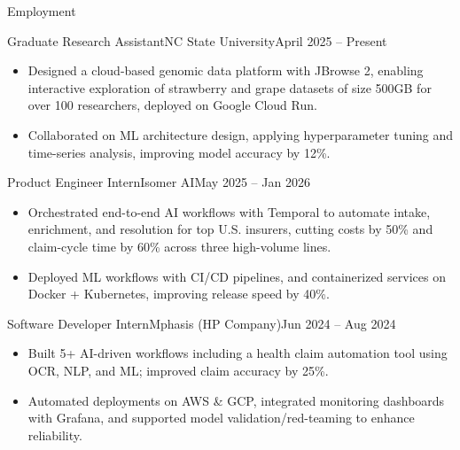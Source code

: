 \documentclass[]{mcdowellcv}
\begin{document}
\makeheader


\begin{cvsection}{Employment}
  \begin{cvsubsection}{Graduate Research Assistant}{NC State University}{April 2025 -- Present}
    \begin{itemize}
      \item Designed a cloud-based genomic data platform with JBrowse 2, enabling interactive exploration of strawberry and grape datasets of size 500GB for over 100 researchers, deployed on Google Cloud Run.
      \item Collaborated on ML architecture design, applying hyperparameter tuning and time-series analysis, improving model accuracy by 12\%.
    \end{itemize}
    \vspace{-1.5pt}
  \end{cvsubsection}

  \begin{cvsubsection}{Product Engineer Intern}{Isomer AI}{May 2025 -- Jan 2026}
    \begin{itemize}
      \item Orchestrated end-to-end AI workflows with Temporal to automate intake, enrichment, and resolution for top U.S. insurers, cutting costs by 50\% and claim-cycle time by 60\% across three high-volume lines.
      \item Deployed ML workflows with CI/CD pipelines, and containerized services on Docker + Kubernetes, improving release speed by 40\%.
    \end{itemize}
    \vspace{-1.5pt}
  \end{cvsubsection}   

  \begin{cvsubsection}{Software Developer Intern}{Mphasis (HP Company)}{Jun 2024 -- Aug 2024}
    \begin{itemize}
      \item Built 5+ AI-driven workflows including a health claim automation tool using OCR, NLP, and ML; improved claim accuracy by 25\%.
      \item Automated deployments on AWS \& GCP, integrated monitoring dashboards with Grafana, and supported model validation/red-teaming to enhance reliability.
    \end{itemize}
    \vspace{-1.5pt}
  \end{cvsubsection}  
  

\end{cvsection}
\end{document}
